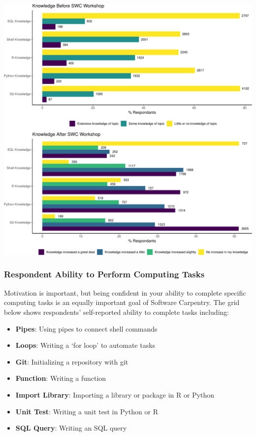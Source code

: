 \documentclass[]{article}
\makeatletter
\def\maxwidth{\ifdim\Gin@nat@width>\linewidth\linewidth\else\Gin@nat@width\fi}
\providecommand{\tightlist}{%
  \setlength{\itemsep}{0pt}\setlength{\parskip}{0pt}}
\makeatother
\begin{document}
\includegraphics[width=\maxwidth]{../figures/swc-knowledge-change-1}

\subsubsection{Respondent Ability to Perform Computing
Tasks}\label{respondent-ability-to-perform-computing-tasks}

Motivation is important, but being confident in your ability to complete
specific computing tasks is an equally important goal of Software
Carpentry. The grid below shows respondents' self-reported ability to
complete tasks including:

\begin{itemize}
\tightlist
\item
  \textbf{Pipes}: Using pipes to connect shell commands
\item
  \textbf{Loops}: Writing a `for loop' to automate tasks\\
\item
  \textbf{Git}: Initializing a repository with git
\item
  \textbf{Function}: Writing a function
\item
  \textbf{Import Library}: Importing a library or package in R or Python
\item
  \textbf{Unit Test}: Writing a unit test in Python or R
\item
  \textbf{SQL Query}: Writing an SQL query
\end{itemize}
\end{document}
